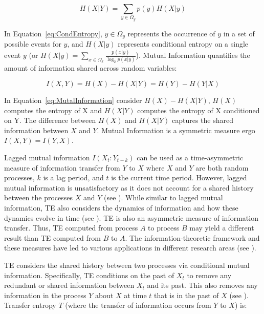 \begin{equation}
\label{eq:CondEntropy}
H(X|Y) = \sum_{y \in \Omega_y} p(y) H(X|y)
\end{equation}

\noindent In Equation~\ref{eq:CondEntropy}, \(y \in \Omega_y\) represents the occurrence of \(y\) in a set of possible events for \(y\), and \(H(X|y)\) represents conditional entropy on a single event \(y\) (or \(H(X|y) = \sum_{x \in \Omega_x}  \frac{p(x|y)}{\log_2p(x|y)} \)). Mutual Information quantifies the amount of information shared across random variables:

\begin{equation}
\label{eq:MutalInformation}
I(X,Y) = H(X) - H(X|Y) = H(Y) - H(Y|X)
\end{equation}

\noindent In Equation~\ref{eq:MutalInformation} consider \(H(X) - H(X|Y)\),  \(H(X)\) computes the entropy of X and \(H(X|Y)\) computes the entropy of X conditioned on Y. The difference between \(H(X)\) and \(H(X|Y)\) captures the shared information between \(X\) and \(Y\). Mutual Information is a symmetric measure ergo \(I(X,Y) = I(Y,X)\).

Lagged mutual information \(I(X_t : Y_{t-k})\) can be used as a time-asymmetric measure of information transfer from \(Y\) to \(X\) where \(X\) and \(Y\) are both random processes, \(k\) is a lag period, and \(t\) is the current time period. However, lagged mutual information is unsatisfactory as it does not account for a shared history between the processes \(X\) and \(Y\) (see \cite{MIdiffTE}). While similar to lagged mutual information,  TE also considers the dynamics of information and how these dynamics evolve in time (see \cite{IntroToTransferEntropy}).  TE is also an asymmetric measure of information transfer. Thus, TE computed from process \(A\) to process \(B\) may yield a different result than TE computed from \(B\) to \(A\). The information-theoretic framework and these measures have led to various applications in different research areas (see \cite{TEBook}).

TE considers the shared history between two processes via conditional mutual information. Specifically, TE conditions on the past of \(X_t\) to remove any redundant or shared information between \(X_t\) and its past. This also removes any information in the process \(Y\) about \(X\) at time \(t\) that is in the past of \(X\) (see \cite{b359}).  Transfer entropy \(T\) (where the transfer of information occurs from \(Y\) to \(X\)) is:

